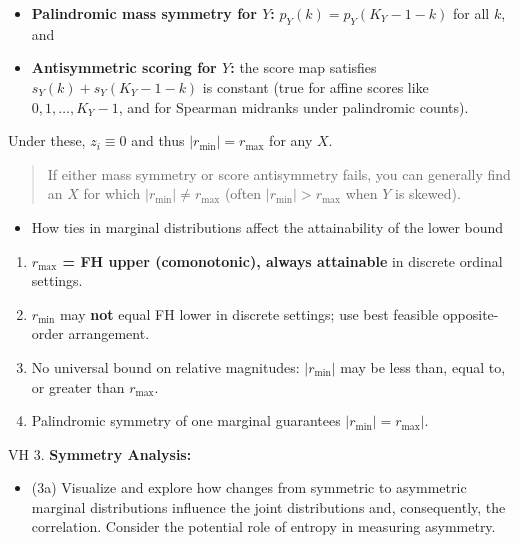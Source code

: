 \documentclass[
  12pt,
]{article}
\providecommand{\tightlist}{%
  \setlength{\itemsep}{0pt}\setlength{\parskip}{0pt}}
\theoremstyle{plain}
\theoremstyle{definition}
\theoremstyle{remark}
\begin{document}
\begin{itemize}
\item
  \textbf{Palindromic mass symmetry for \(Y\):} \(p_Y(k)=p_Y(K_Y-1-k)\)
  for all \(k\), and
\item
  \textbf{Antisymmetric scoring for \(Y\):} the score map satisfies
  \(s_Y(k)+s_Y(K_Y-1-k)\) is constant (true for affine scores like
  \(0,1,\dots,K_Y-1\), and for Spearman midranks under palindromic
  counts).
\end{itemize}

Under these, \(z_i\equiv 0\) and thus \(|r_{\min}|=r_{\max}\) for any
\(X\).

\begin{quote}
If either mass symmetry or score antisymmetry fails, you can generally
find an \(X\) for which \(|r_{\min}|\ne r_{\max}\) (often
\(|r_{\min}|>r_{\max}\) when \(Y\) is skewed).
\end{quote}

\begin{itemize}
\tightlist
\item
  How ties in marginal distributions affect the attainability of the
  lower bound
\end{itemize}

\begin{enumerate}
\def\labelenumi{\arabic{enumi}.}
\tightlist
\item
  \textbf{\(r_{\max}\) = FH upper (comonotonic), always attainable} in
  discrete ordinal settings.
\item
  \textbf{\(r_{\min}\)} may \textbf{not} equal FH lower in discrete
  settings; use best feasible opposite-order arrangement.
\item
  No universal bound on relative magnitudes: \(|r_{\min}|\) may be less
  than, equal to, or greater than \(r_{\max}\).
\item
  Palindromic symmetry of one marginal guarantees
  \(|r_{\min}| = r_{\max}|\).
\end{enumerate}

VH 3. \textbf{Symmetry Analysis:}

\begin{itemize}
\tightlist
\item
  (3a) Visualize and explore how changes from symmetric to asymmetric
  marginal distributions influence the joint distributions and,
  consequently, the correlation. Consider the potential role of entropy
  in measuring asymmetry.
\end{itemize}
\end{document}
